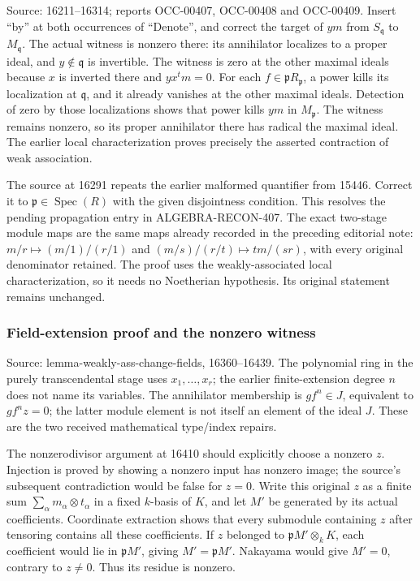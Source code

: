 Source: 16211--16314; reports OCC-00407, OCC-00408 and OCC-00409. Insert ``by'' at both occurrences of ``Denote'', and correct the target of \(ym\) from \(S_{\mathfrak q}\) to \(M_{\mathfrak q}\). The actual witness is nonzero there: its annihilator localizes to a proper ideal, and \(y\notin\mathfrak q\) is invertible. The witness is zero at the other maximal ideals because \(x\) is inverted there and \(yx^tm=0\). For each \(f\in\mathfrak pR_{\mathfrak p}\), a power kills its localization at \(\mathfrak q\), and it already vanishes at the other maximal ideals. Detection of zero by those localizations shows that power kills \(ym\) in \(M_{\mathfrak p}\). The witness remains nonzero, so its proper annihilator there has radical the maximal ideal. The earlier local characterization proves precisely the asserted contraction of weak association.

The source at 16291 repeats the earlier malformed quantifier from 15446. Correct it to \(\mathfrak p\in\operatorname{Spec}(R)\) with the given disjointness condition. This resolves the pending propagation entry in ALGEBRA-RECON-407. The exact two-stage module maps are the same maps already recorded in the preceding editorial note: \(m/r\mapsto(m/1)/(r/1)\) and \((m/s)/(r/t)\mapsto tm/(sr)\), with every original denominator retained. The proof uses the weakly-associated local characterization, so it needs no Noetherian hypothesis. Its original statement remains unchanged.

\subsubsection{Field-extension proof and the nonzero witness}\label{algebra-proof-005-field-extension-proof-and-the-nonzero-witness}

Source: lemma-weakly-ass-change-fields, 16360--16439. The polynomial ring in the purely transcendental stage uses \(x_1,\ldots,x_r\); the earlier finite-extension degree \(n\) does not name its variables. The annihilator membership is \(gf^n\in J\), equivalent to \(gf^nz=0\); the latter module element is not itself an element of the ideal \(J\). These are the two received mathematical type/index repairs.

The nonzerodivisor argument at 16410 should explicitly choose a nonzero \(z\). Injection is proved by showing a nonzero input has nonzero image; the source's subsequent contradiction would be false for \(z=0\). Write this original \(z\) as a finite sum \(\sum_\alpha m_\alpha\otimes t_\alpha\) in a fixed \(k\)-basis of \(K\), and let \(M'\) be generated by its actual coefficients. Coordinate extraction shows that every submodule containing \(z\) after tensoring contains all these coefficients. If \(z\) belonged to \(\mathfrak pM'\otimes_kK\), each coefficient would lie in \(\mathfrak pM'\), giving \(M'=\mathfrak pM'\). Nakayama would give \(M'=0\), contrary to \(z\ne0\). Thus its residue is nonzero.

